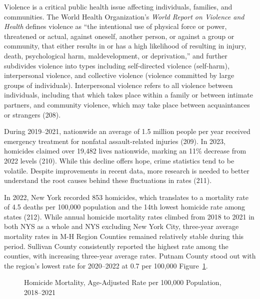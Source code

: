 \documentclass[
  english,
  letterpaper,
]{report}
\begin{document}
Violence is a critical public health issue affecting individuals,
families, and communities. The World Health Organization's \emph{World
Report on Violence and Health} defines violence as ``the intentional use
of physical force or power, threatened or actual, against oneself,
another person, or against a group or community, that either results in
or has a high likelihood of resulting in injury, death, psychological
harm, maldevelopment, or deprivation,'' and further subdivides violence
into types including self-directed violence (self-harm), interpersonal
violence, and collective violence (violence committed by large groups of
individuals). Interpersonal violence refers to all violence between
individuals, including that which takes place within a family or between
intimate partners, and community violence, which may take place between
acquaintances or strangers (208).

During 2019--2021, nationwide an average of 1.5 million people per year
received emergency treatment for nonfatal assault-related injuries
(209). In 2023, homicides claimed over 19,482 lives nationwide, marking
an 11\% decrease from 2022 levels (210). While this decline offers hope,
crime statistics tend to be volatile. Despite improvements in recent
data, more research is needed to better understand the root causes
behind these fluctuations in rates (211).

In 2022, New York recorded 853 homicides, which translates to a
mortality rate of 4.5 deaths per 100,000 population and the 14th lowest
homicide rate among states (212). While annual homicide mortality rates
climbed from 2018 to 2021 in both NYS as a whole and NYS excluding New
York City, three-year average mortality rates in M-H Region Counties
remained relatively stable during this period. Sullivan County
consistently reported the highest rate among the counties, with
increasing three-year average rates. Putnam County stood out with the
region's lowest rate for 2020--2022 at 0.7 per 100,000
Figure~\ref{fig-mortal-homicide-aar}.

\begin{figure}


\caption{\label{fig-mortal-homicide-aar}Homicide Mortality, Age-Adjusted
Rate per 100,000 Population, 2018--2021}

\end{figure}%
\end{document}
